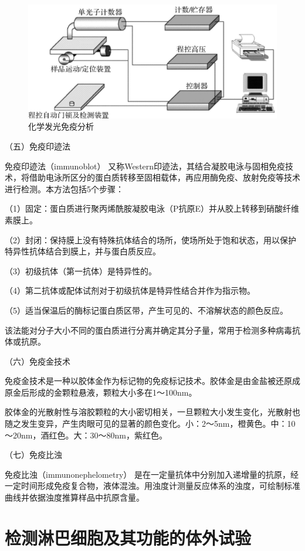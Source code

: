 \begin{figure}[!htbp]
 \centering
 \includegraphics{./images/Image00175.jpg}
 \captionsetup{justification=centering}
 \caption{化学发光免疫分析}
 \label{fig10-21}
  \end{figure} 

（五）免疫印迹法

免疫印迹法（immunoblot）
又称Western印迹法，其结合凝胶电泳与固相免疫技术，将借助电泳所区分的蛋白质转移至固相载体，再应用酶免疫、放射免疫等技术进行检测。本方法包括5个步骤：

（1）固定：蛋白质进行聚丙烯酰胺凝胶电泳（P抗原E）并从胶上转移到硝酸纤维素膜上。

（2）封闭：保持膜上没有特殊抗体结合的场所，使场所处于饱和状态，用以保护特异性抗体结合到膜上，并与蛋白质反应。

（3）初级抗体（第一抗体）是特异性的。

（4）第二抗体或配体试剂对于初级抗体是特异性结合并作为指示物。

（5）适当保温后的酶标记蛋白质区带，产生可见的、不溶解状态的颜色反应。

该法能对分子大小不同的蛋白质进行分离并确定其分子量，常用于检测多种病毒抗体或抗原。

（六）免疫金技术

免疫金技术是一种以胶体金作为标记物的免疫标记技术。胶体金是由金盐被还原成原金后形成的金颗粒悬液，颗粒大小多在1～100nm。

胶体金的光散射性与溶胶颗粒的大小密切相关，一旦颗粒大小发生变化，光散射也随之发生变异，产生肉眼可见的显著的颜色变化。小：2～5nm，橙黄色。中：10～20nm，酒红色。大：30～80nm，紫红色。

（七）免疫比浊

免疫比浊（immunonephelometry）
是在一定量抗体中分别加入递增量的抗原，经一定时间形成免疫复合物，液体混浊。用浊度计测量反应体系的浊度，可绘制标准曲线并依据浊度推算样品中抗原含量。

\section{检测淋巴细胞及其功能的体外试验}


